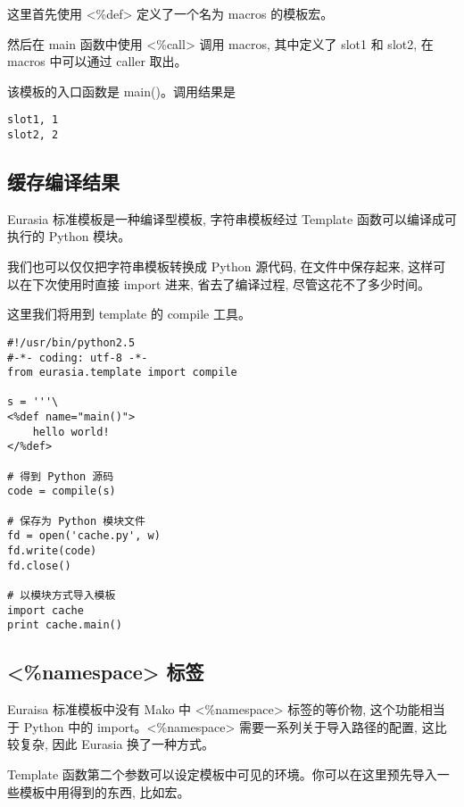 \documentclass{manual}
\begin{document}
这里首先使用 <\%def> 定义了一个名为 macros 的模板宏。

然后在 main 函数中使用 <\%call> 调用 macros, 其中定义了 slot1 和 slot2, 在 macros 中可以通过 caller 取出。

该模板的入口函数是 main()。调用结果是

\begin{verbatim}
slot1, 1
slot2, 2
\end{verbatim}



\subsection{缓存编译结果}

Eurasia 标准模板是一种编译型模板, 字符串模板经过 Template 函数可以编译成可执行的 Python 模块。

我们也可以仅仅把字符串模板转换成 Python 源代码, 在文件中保存起来, 这样可以在下次使用时直接 import 进来, 省去了编译过程, 尽管这花不了多少时间。

这里我们将用到 template 的 compile 工具。

\begin{verbatim}
#!/usr/bin/python2.5
#-*- coding: utf-8 -*-
from eurasia.template import compile

s = '''\
<%def name="main()">
	hello world!
</%def>

# 得到 Python 源码
code = compile(s)

# 保存为 Python 模块文件
fd = open('cache.py', w)
fd.write(code)
fd.close()

# 以模块方式导入模板
import cache
print cache.main()
\end{verbatim}

\subsection{<\%namespace> 标签}

Euraisa 标准模板中没有 Mako 中 <\%namespace> 标签的等价物, 这个功能相当于 Python 中的 import。<\%namespace> 需要一系列关于导入路径的配置, 这比较复杂, 因此 Eurasia 换了一种方式。

Template 函数第二个参数可以设定模板中可见的环境。你可以在这里预先导入一些模板中用得到的东西, 比如宏。
\end{document}
